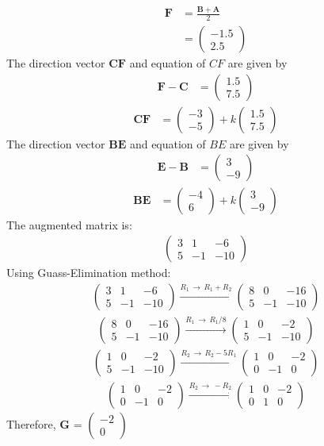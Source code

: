 \documentclass[journal,12pt,twocolumn]{IEEEtran}
\theoremstyle{remark}
\newcommand{\myvec}[1]{\begin{pmatrix}#1\end{pmatrix}}
\let\vec\mathbf
\begin{document}
\begin{align}
    \vec{F} &= \frac{\vec{B} + \vec{A}}{2} \\
    &= \myvec{-1.5 \\ 2.5}
\end{align}
The direction vector $\vec{CF}$ and equation of $CF$ are given by
\begin{align}
\vec{F} - \vec{C} &= \myvec{1.5 \\ 7.5}
\end{align}
\begin{align}
\text{} \vec{CF} &= \myvec{-3\\-5} + k \myvec{1.5\\7.5}
\end{align}
The direction vector $\vec{BE}$ and equation of $BE$ are given by
\begin{align}
\vec{E} - \vec{B} &= \myvec{3 \\ -9}
\end{align}
\begin{align}
 \vec{BE} &= \myvec{-4\\6} + k \myvec{3\\-9}
\end{align}
The augmented matrix is:
\begin{align}
\myvec{
3 & 1 & -6 \\
5 & -1 & -10
}
\end{align}
Using Guass-Elimination method:
\begin{align}
\myvec{
3 & 1 & -6 \\
5 & -1 & -10
}
\xrightarrow{R_{1}\,\xrightarrow{}\,R_{1}+R_{2}}
\myvec{
8 & 0 & -16 \\
5 & -1 & -10
}
\end{align}
\begin{align}
\myvec{
8 & 0 & -16 \\
5 & -1 & -10
}
\xrightarrow{R_{1}\,\xrightarrow{}\,R_{1}/8}
\myvec{
1 & 0 & -2 \\
5 & -1 & -10
}
\end{align} 
\begin{align}
\myvec{
1 & 0 & -2 \\
5 & -1 & -10
}
\xrightarrow{R_{2}\,\xrightarrow{}\,R_{2}-5R_{1}}
\myvec{
1 & 0 & -2 \\
0 & -1 & 0
}
\end{align} 
\begin{align}
\myvec{
1 & 0 & -2 \\
0 & -1 & 0
}
\xrightarrow{R_{2}\,\xrightarrow{}\,-R_{2}}
\myvec{
1 & 0 & -2 \\
0 & 1 & 0
}
\end{align} 
Therefore, $\vec{G}$ = $\myvec{-2 \\ 0}$
%
{}
\end{document}

